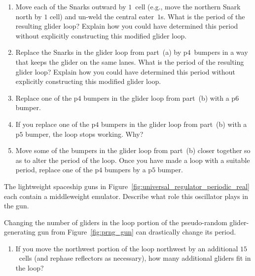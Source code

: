 \begin{multicols}{2}
\begin{problemstar}
		\begin{enumerate}[label=\bf\color{ocre}(\alph*)]
			\item {} Move each of the Snarks outward by $1$~cell (e.g., move the northern Snark north by $1$ cell) and un-weld the central eater~$1$s. What is the period of the resulting glider loop? Explain how you could have determined this period without explicitly constructing this modified glider loop.
			
			\item {} Replace the Snarks in the glider loop from part~(a) by p$4$~bumpers in a way that keeps the glider on the same lanes. What is the period of the resulting glider loop? Explain how you could have determined this period without explicitly constructing this modified glider loop.
			
			\item {} Replace one of the p$4$ bumpers in the glider loop from part~(b) with a p$6$ bumper.
			
			\item {} If you replace one of the p$4$ bumpers in the glider loop from part~(b) with a p$5$ bumper, the loop stops working. Why?
			
			\item {} Move some of the bumpers in the glider loop from part~(b) closer together so as to alter the period of the loop. Once you have made a loop with a suitable period, replace one of the p$4$ bumpers by a p$5$ bumper.
		\end{enumerate}
	\end{problemstar}
	
	
	\mfilbreak
	
	
	\begin{problemstar}\label{exer:p60_regulator_mwss_emulator} 
		The lightweight spaceship guns in Figure~\ref{fig:universal_regulator_periodic_real} each contain a middleweight emulator. Describe what role this oscillator plays in the gun.
	\end{problemstar}
	
	
	\mfilbreak
	
	
	\begin{problemstar}\label{exer:prng_gun}
		Changing the number of gliders in the loop portion of the pseudo-random glider-generating gun from Figure~\ref{fig:prng_gun} can drastically change its period.\smallskip
		
		\begin{enumerate}[label=\bf\color{ocre}(\alph*)]
			\item {} If you move the northwest portion of the loop northwest by an additional $15$~cells (and rephase reflectors as necessary), how many additional gliders fit in the loop?
			

\end{enumerate}
\end{problemstar}
\end{multicols}
